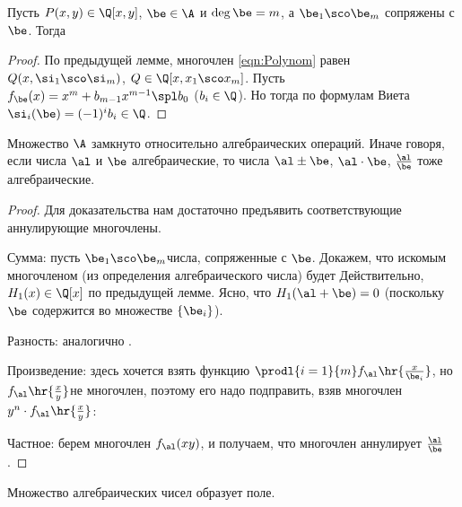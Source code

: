 \documentclass[a4paper]{article}
\begin{document}
\begin{imp}\label{imp:rationalPoly}
Пусть $P(x,y)\in\Q[x,y]$, $\be \in\A$ и $\deg\be = m$, а $\be_1\sco \be_m$
сопряжены с $\be$. Тогда
\end{imp}
\begin{proof}
По предыдущей лемме, многочлен \eqref{eqn:Polynom} равен
$Q(x,\si_1\sco \si_m)$, $Q\in\Q[x,x_1\sco x_m]$. Пусть
$f_\be (x)=x^m+b_{m-1}x^{m-1}\spl b_0$ ($b_i \in \Q$). Но тогда по формулам Виета
$\si_i(\be)=(-1)^ib_i\in\Q$.
\end{proof}

\begin{theorem}\label{thm:algClosureField}
Множество $\A$ замкнуто относительно алгебраических операций. Иначе говоря, если
числа $\al$ и $\be$ алгебраические, то числа $\al\pm\be$, $\al\cdot\be$, $\frac{\al}{\be}$ тоже
алгебраические.
\end{theorem}
\begin{proof}
Для доказательства нам достаточно предъявить соответствующие аннулирующие многочлены.

 Сумма: пусть $\be_1\sco \be_m$\т числа, сопряженные с $\be$. Докажем, что искомым многочленом (из
определения алгебраического числа) будет
Действительно, $H_1(x)\in\Q[x]$ по предыдущей лемме. Ясно, что $H_1(\al+\be)=0$
(поскольку $\be$ содержится во множестве $\{\be_i\}$).

 Разность: аналогично .

 Произведение: здесь хочется взять функцию $\prodl{i=1}{m}f_{\al}\hr{\frac{x}{\be_i}}$, но
$f_{\al}\hr{\frac{x}{y}}$\т не многочлен, поэтому его надо подправить, взяв многочлен $y^n\cdot f_\al\hr{\frac xy}$:

 Частное: берем многочлен $f_\al(xy)$, и получаем, что многочлен
аннулирует $\frac\al\be$.
\end{proof}

\begin{imp}
Множество алгебраических чисел образует поле.
\end{imp}
\end{document}
